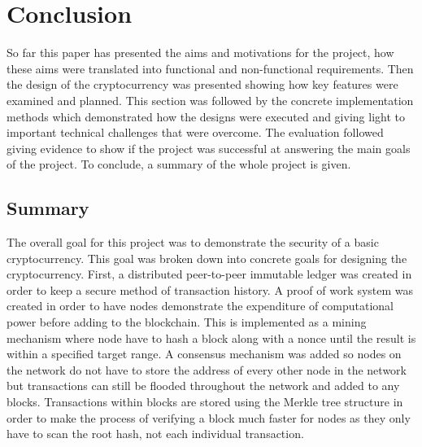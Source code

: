 \documentclass{l4proj}
\begin{document}
\chapter{Conclusion}
So far this paper has presented the aims and motivations for the project, how these aims were translated into functional
and non-functional requirements. Then the design of the cryptocurrency was presented showing how key features were examined
and planned. This section was followed by the concrete implementation methods which demonstrated how the designs were 
executed and giving light to important technical challenges that were overcome. The evaluation followed giving evidence
to show if the project was successful at answering the main goals of the project. To conclude, a summary of the whole 
project is given.

\section{Summary}
The overall goal for this project was to demonstrate the security of a basic cryptocurrency. This goal was broken down
into concrete goals for designing the cryptocurrency. First, a distributed peer-to-peer immutable ledger was created 
in order to keep a secure method of transaction history. A proof of work system was created in order to have nodes
demonstrate the expenditure of computational power before adding to the blockchain. This is implemented as a mining
mechanism where node have to hash a block along with a nonce until the result is within a specified target range. A
consensus mechanism was added so nodes on the network do not have to store the address of every other node in the network
but transactions can still be flooded throughout the network and added to any blocks. Transactions within blocks are
stored using the Merkle tree structure in order to make the process of verifying a block much faster for nodes as they
only have to scan the root hash, not each individual transaction.
\end{document}
